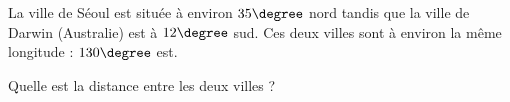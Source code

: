 
\begin{exercice}\label{exosmath-0467}

    La ville de Séoul est située à environ \( 35\degree\) nord tandis que la ville de Darwin (Australie) est à \( 12\degree\) sud. Ces deux villes sont à environ la même longitude : \( 130\degree\) est.

    Quelle est la distance entre les deux villes ?

\end{exercice}
